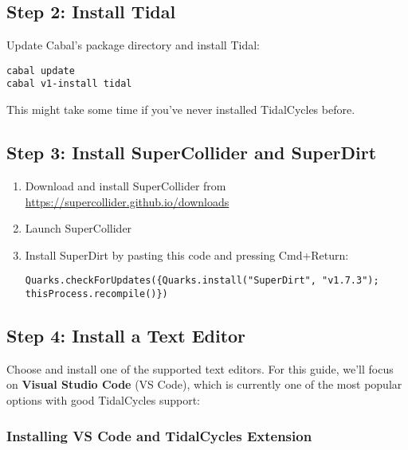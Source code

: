 \documentclass[11pt,a4paper]{article}
\begin{document}
\subsection{Step 2: Install Tidal}

Update Cabal's package directory and install Tidal:
\begin{lstlisting}[style=bash]
cabal update
cabal v1-install tidal
\end{lstlisting}

This might take some time if you've never installed TidalCycles before.

\subsection{Step 3: Install SuperCollider and SuperDirt}

\begin{enumerate}
    \item Download and install SuperCollider from \href{https://supercollider.github.io/downloads}{https://supercollider.github.io/downloads}
    \item Launch SuperCollider
    \item Install SuperDirt by pasting this code and pressing Cmd+Return:
    \begin{lstlisting}[style=supercollider]
Quarks.checkForUpdates({Quarks.install("SuperDirt", "v1.7.3"); thisProcess.recompile()})
    \end{lstlisting}
\end{enumerate}

\subsection{Step 4: Install a Text Editor}

Choose and install one of the supported text editors. For this guide, we'll focus on \textbf{Visual Studio Code} (VS Code), which is currently one of the most popular options with good TidalCycles support:

\subsubsection{Installing VS Code and TidalCycles Extension}
\end{document}
